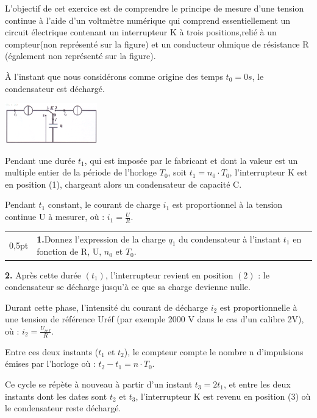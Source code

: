 \documentclass[12pt]{article}
\begin{document}
 L'objectif de cet exercice est de comprendre le principe de mesure d'une tension continue à l'aide d'un voltmètre numérique qui comprend essentiellement un circuit électrique contenant un interrupteur K à trois positions,relié à un compteur(non représenté sur la figure) et un conducteur ohmique de résistance R (également non représenté sur la figure).

À l'instant que nous considérons comme origine des temps $t_0 = 0s$, le condensateur est déchargé.


\begin{center}
	\includegraphics[width=0.3\textwidth]{./img/capcity00.png}
  \end{center}

  Pendant une durée $t_1$, qui est imposée par le fabricant et dont la valeur est un multiple entier de la période de l'horloge $T_0$, soit $t_1 = n_0·T_0$, l'interrupteur K est en position (1), chargeant alors un condensateur de capacité C.

  Pendant $t_1$ constant, le courant de charge $i_1$ est proportionnel à la tension continue U à mesurer, où : $i_1 = \frac{U}{R}$.\\

\begin{tabular}{c|l}	

  0,5pt  & \makecell[l]{\textbf{1.}Donnez l'expression de la charge $q_1$ du condensateur à l'instant $t_1$ en fonction de R, U, $n_0$ \\et $T_0$. }\\
\end{tabular}

\textbf{2. }Après cette durée $(t_1)$, l'interrupteur revient en position $(2)$ : le condensateur se décharge jusqu'à ce que sa charge devienne nulle.

Durant cette phase, l'intensité du courant de décharge $i_2$ est proportionnelle à une tension de référence Uréf (par exemple 2000 V dans le cas d'un calibre 2V), où : $i_2 = \frac{U_{ref}}{R}$.

Entre ces deux instants ($t_1$ et $t_2$), le compteur compte le nombre n d'impulsions émises par l'horloge où : $t_2 - t_1 = n·T_0$.

Ce cycle se répète à nouveau à partir d'un instant $t_3 = 2t_1$, et entre les deux instants dont les dates sont $t_2$ et $t_3$, l'interrupteur K est revenu en position (3) où le condensateur reste déchargé.
\end{document}

